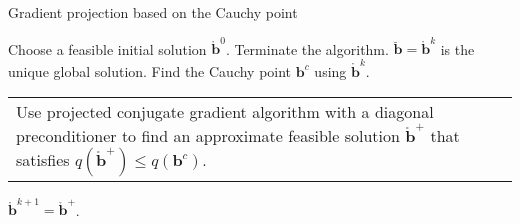 \documentclass[11pt]{article}
\makeatletter
\newcommand{\0}{\phantom{0}}
\newcommand{\multiline}[1]{%
	\begin{tabularx}{\dimexpr\linewidth-\ALG@thistlm}[t]{@{}X@{}}
		#1
	\end{tabularx}
}
\makeatother
\begin{document}
%
%

\begin{algorithm}
	\caption{Gradient projection based on the Cauchy point}
	\label{alg:gradproj}
	\begin{spacing}{1.3}
		\begin{algorithmic}[1]
			\Require Choose a feasible initial solution $\mathring{\bm{b}}^{0}$.
			\State Terminate the algorithm. $\breve{\bm{b}} = \mathring{\bm{b}}^{k}$ is the unique global solution.
			\Else {}
			\State Find the Cauchy point $\bm{b}^{c}$ using $\mathring{\bm{b}}^{k}$.
			\State \multiline{Use projected conjugate gradient algorithm with a diagonal preconditioner to find an approximate feasible solution $\mathring{\bm{b}}^{+}$ that satisfies $q(\mathring{\bm{b}}^{+}) \leq q(\bm{b}^{c})$.}
			\State $\mathring{\bm{b}}^{k+1} = \mathring{\bm{b}}^{+}$.
			\EndIf
			\EndFor
		\end{algorithmic}
	\end{spacing}
\end{algorithm}
\end{document}
